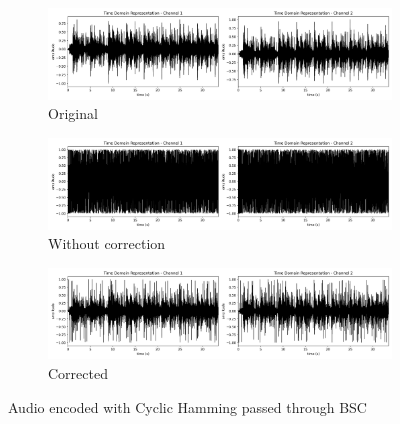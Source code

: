 \documentclass{article}
\begin{document}
\begin{figure}
    \centering
    \begin{subfigure}[b]{\textwidth}
        \centering
        \includegraphics[width=\textwidth]{../Result/wav-time-domain-TX.png}
        \caption{Original}
        \label{fig:t-audio-cyclic-bsc-original}
    \end{subfigure}
    \begin{subfigure}[b]{\textwidth}
        \centering
        \includegraphics[width=\textwidth]{../Result/cyclic-bsc-wav-time-domain-RX.png}
        \caption{Without correction}
        \label{fig:t-audio-cyclic-bsc-no-correction}
    \end{subfigure}
    \begin{subfigure}[b]{\textwidth}
        \centering
        \includegraphics[width=\textwidth]{../Result/cyclic-bsc-wav-time-domain-RX-syndrome-corrected.png}
        \caption{Corrected}
        \label{fig:t-audio-cyclic-bsc-syndrome-syndrome-corrected}
    \end{subfigure}
       \caption{Audio encoded with Cyclic Hamming passed through BSC}
       \label{fig:t-audio-cyclic-bsc}
\end{figure}
\end{document}
